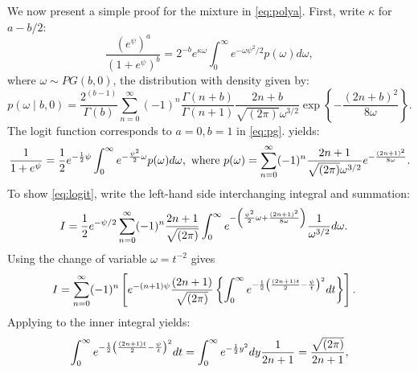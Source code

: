 \documentclass[lineno]{biometrika}
\begin{document}
%
We now present a simple proof for the \PG mixture in \eqref{eq:polya}. First, write $\kappa$ for $a-b/2$: 
\begin{equation}
  \frac{(e^{\psi})^a}{(1+e^{\psi})^b} = 2^{-b} e^{\kappa \omega} \int_0^{\infty} e^{-\omega \psi^2/2} p(\omega) d\omega, \label{eq:pg}
\end{equation}
where $\omega \sim PG(b,0)$, the \PG distribution with density given by: 
$$
p(\omega \mid b, 0) = \frac{2^{(b-1)}}{\Gamma(b)} \sum_{n=0}^{\infty} (-1)^n \frac{\Gamma(n+b)}{\Gamma(n+1)} \frac{2n+b}{\sqrt{(2\pi)} \omega^{3/2}} \exp \left\{-\frac{(2n+b)^2}{8\omega} \right\}.
$$
The logit function corresponds to $a=0,b=1$ in \eqref{eq:pg}. \CS yields:  
\begin{equation}
  \frac{1}{1+e^{\psi}} = \half e^{-\half \psi} \int_0^{\infty} e^{-\frac{\psi^2}{2} \omega} p(\omega) d\omega,
  \text{ where } p(\omega) = \sum_{n=0}^{\infty} (-1)^n \frac{2n+1}{\sqrt{(2\pi)} \omega^{3/2}} e^{-\frac{(2n+1)^2}{8\omega}}.
  \label{eq:logit}
\end{equation}
To show \eqref{eq:logit}, write the left-hand side interchanging integral and summation:
\begin{align*}
I & = \frac{1}{2} e^{-\psi/2}  \sum_{n=0}^{\infty} (-1)^n \frac{2n+1}{\sqrt{(2\pi)}} \int_0^{\infty} e^{- \left( \frac{\psi^2}{2}  \omega + \frac{(2n+1)^2}{8\omega} \right) } \frac{1}{\omega^{3/2}} d\omega. 
\end{align*}
Using the change of variable $\omega = t^{-2}$ gives
\begin{align*}
I & = \sum_{n=0}^{\infty} (-1)^n \left[  e^{-(n+1)\psi} \frac{(2n+1)}{\sqrt{(2\pi)}} \left\{ \int_{0}^{\infty}e^{-\frac{1}{2} \left( \frac{(2n+1)t}{2} - \frac{\psi}{t}\right)^2 } dt \right\} \right].
\end{align*}
Applying \CS to the inner integral yields: 
$$ 
\int_{0}^{\infty}e^{-\frac{1}{2} \left( \frac{(2n+1)t}{2} - \frac{\psi}{t}\right)^2 } dt = \int_0^{\infty} e^{-\frac{1}{2} y^2} dy \frac{1}{2n+1} = \frac{\sqrt{(2\pi)}}{2n+1},
$$
\end{document}
